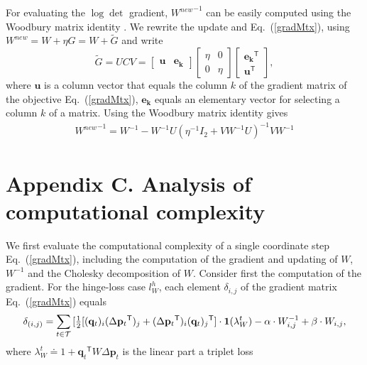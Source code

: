\documentclass[twoside,11pt]{article}
\newcommand\mat[1]{{#1}}
\renewcommand\vec[1]{\mathbf{#1}}
\newcommand{\T}{{}^\mathsf{T}}
\newcommand{\W}{\mat{W}}
\newcommand{\newW}{{\mat{W^{new}}}}
\newcommand{\eqdef}{\doteq}
\newcommand{\q}{{\vec{q}}}
\newcommand{\p}{{\vec{p}}}
\newcommand{\trip}{{t}}
\newcommand{\qt}{{\q_{\trip}}}
\renewcommand{\eqref}[1]{Eq.~(\ref{#1})}
\begin{document}
For evaluating the $\log\det$ gradient, $\newW^{-1}$ can be easily computed using the Woodbury matrix
identity \citep{woodbury1950inverting}. We rewrite the update and \eqref{gradMtx}, using $\newW = \W + \eta G = \W+\mat{\widetilde{G}}$
and write
\begin{equation}
  \mat{\widetilde{G}} = \mat{U}\mat{C}\mat{V} = \left[ \begin{matrix}
      \vec{u} & \vec{e_k} \end{matrix} \right] \left[ \begin{matrix}
      \eta & 0 \\ 0 & \eta \end{matrix} \right] \left[ \begin{matrix}
      \vec{e_k}\T \\ \vec{u}\T \end{matrix} \right],
  \label{gradMtxWDB}
  \nonumber 
\end{equation}
where $\vec{u}$ is a column vector that equals the column $k$ of the gradient matrix of the objective \eqref{gradMtx},
$\vec{e_k}$ equals an elementary vector for selecting a column $k$ of
a matrix. 
Using the Woodbury matrix identity gives 
\begin{equation}
    \begin{array}{lcl}
    \newW^{-1} = 
    \W^{-1} - \W^{-1} \mat{U} (\eta^{-1} I_2 + \mat{V}     \W^{-1} \mat{U})^{-1} \mat{V} \W^{-1}
    \end{array}
    \nonumber
    \label{InvWwdb}
\end{equation}

 

\section*{Appendix C. Analysis of computational complexity}


We first evaluate the computational complexity of a single coordinate step \eqref{gradMtx}, including the computation of the gradient and updating of $\W$, $\W^{-1}$ and the Cholesky decomposition of $\W$. Consider first the computation of the gradient. For the hinge-loss case $l^{h}_W$, each element $\delta_{i,j}$ of the gradient matrix \eqref{gradMtx} equals
\begin{equation}
    \delta_{(i,j)} = \sum\limits_{t\in \cal{T}}{ [\tfrac{1}{2}[(\vec{q}_{t})_i(\Delta\vec{p}_{t}\T)_j + (\Delta\vec{p}_{t}\T)_i(\vec{q}_{t})_j\T] } \cdot \textbf{1}(\lambda_{W}^t) - \alpha \cdot \W^{-1}_{i,j} + \beta \cdot \W_{i,j},
\label{gradMatElem}
\end{equation}
where $\lambda_{W}^t \eqdef 1+\qt\T \W \Delta\p_{t}$ is the linear part a triplet loss
\end{document}
